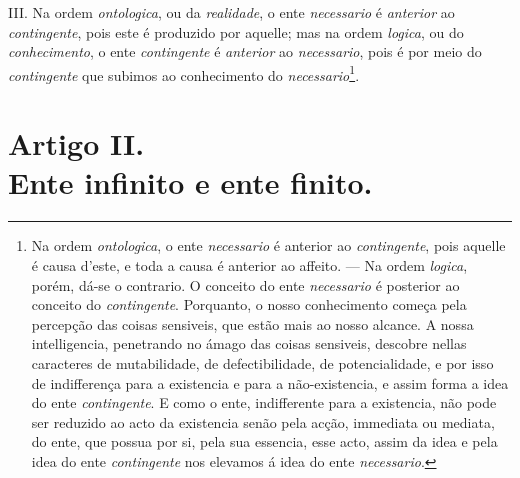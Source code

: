
III. Na ordem \emph{ontologica}, ou da \emph{realidade}, o ente \emph{necessario} é \emph{anterior} ao \emph{contingente}, pois este é produzido por aquelle; mas na ordem \emph{logica}, ou do \emph{conhecimento}, o ente \emph{contingente} é \emph{anterior} ao \emph{necessario}, pois é por meio do \emph{contingente} que subimos ao conhecimento do \emph{necessario}\footnote{Na ordem \emph{ontologica}, o ente \emph{necessario} é anterior ao \emph{contingente}, pois aquelle é causa d'este, e toda a causa é anterior ao affeito. --- Na ordem \emph{logica}, porém, dá-se o contrario. O conceito do ente \emph{necessario} é posterior ao conceito do \emph{contingente}. Porquanto, o nosso conhecimento começa pela percepção das coisas sensiveis, que estão mais ao nosso alcance. A nossa intelligencia, penetrando no ámago das coisas sensiveis, descobre nellas caracteres de mutabilidade, de defectibilidade, de potencialidade, e por isso de indifferença para a existencia e para a não-existencia, e assim forma a idea do ente \emph{contingente}. E como o ente, indifferente para a existencia, não pode ser reduzido ao acto da existencia senão pela acção, immediata ou mediata, do ente, que possua por si, pela sua essencia, esse acto, assim da idea e pela idea do ente \emph{contingente} nos elevamos á idea do ente \emph{necessario}.}.


\section*{Artigo II.\\ Ente infinito e ente finito.}

